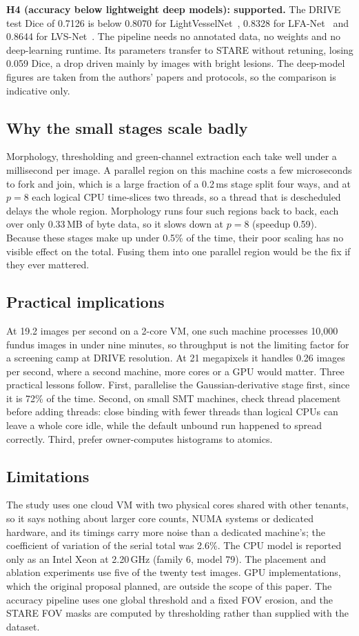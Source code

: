 \textbf{H4 (accuracy below lightweight deep models): supported.} The DRIVE test Dice of 0.7126 is below 0.8070
for LightVesselNet~\cite{sobhan2026}, 0.8328 for LFA-Net~\cite{mehmood2025lfa} and 0.8644 for
LVS-Net~\cite{mehmood2024lvs}. The pipeline needs no annotated data, no weights and no deep-learning runtime.
Its parameters transfer to STARE without retuning, losing 0.059 Dice, a drop driven mainly by images with
bright lesions. The deep-model figures are taken from the authors' papers and protocols, so the comparison is
indicative only.

\subsection{Why the small stages scale badly}
Morphology, thresholding and green-channel extraction each take well under a millisecond per image. A parallel
region on this machine costs a few microseconds to fork and join, which is a large fraction of a 0.2\,ms stage
split four ways, and at $p=8$ each logical CPU time-slices two threads, so a thread that is descheduled
delays the whole region. Morphology runs four such regions back to back, each over only 0.33\,MB of byte
data, so it slows down at $p=8$ (speedup 0.59). Because these stages make up under
0.5\% of the time, their poor scaling has no visible effect on the total. Fusing them into one parallel region
would be the fix if they ever mattered.

\subsection{Practical implications}
At 19.2 images per second on a 2-core VM, one such machine processes 10{,}000 fundus images in under nine
minutes, so throughput is not the limiting factor for a screening camp at DRIVE resolution. At 21 megapixels it
handles 0.26 images per second, where a second machine, more cores or a GPU would matter. Three practical
lessons follow. First, parallelise the Gaussian-derivative stage first, since it is 72\% of the time. Second,
on small SMT machines, check thread placement before adding threads: close binding with fewer threads than
logical CPUs can leave a whole core idle, while the default unbound run happened to spread correctly. Third,
prefer owner-computes histograms to atomics.

\subsection{Limitations}
The study uses one cloud VM with two physical cores shared with other tenants, so it says nothing about larger
core counts, NUMA systems or dedicated hardware, and its timings carry more noise than a dedicated machine's;
the coefficient of variation of the serial total was 2.6\%. The CPU model is reported only as an Intel Xeon at
2.20\,GHz (family 6, model 79). The placement and ablation experiments use five of the twenty test images. GPU
implementations, which the original proposal planned, are outside the scope of this paper. The accuracy
pipeline uses one global threshold and a fixed FOV erosion, and the STARE FOV masks are computed by
thresholding rather than supplied with the dataset.
